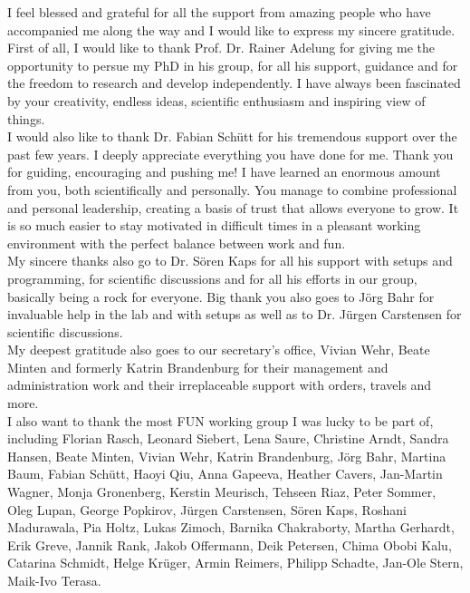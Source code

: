 I feel blessed and grateful for all the support from amazing people who have accompanied me along the way and I would like to express my sincere gratitude.\\

First of all, I would like to thank Prof. Dr. Rainer Adelung for giving me the opportunity to persue my PhD in his group, for all his support, guidance and for the freedom to research and develop independently. I have always been fascinated by your creativity, endless ideas, scientific enthusiasm and inspiring view of things.\\ 

I would also like to thank Dr. Fabian Schütt for his tremendous support over the past few years. I deeply appreciate everything you have done for me. Thank you for guiding, encouraging and pushing me! I have learned an enormous amount from you, both scientifically and personally. You manage to combine professional and personal leadership, creating a basis of trust that allows everyone to grow. It is so much easier to stay motivated in difficult times in a pleasant working environment with the perfect balance between work and fun.\\

My sincere thanks also go to Dr. Sören Kaps for all his support with setups and programming, for scientific discussions and for all his efforts in our group, basically being a rock for everyone. Big thank you also goes to Jörg Bahr for invaluable help in the lab and with setups as well as to Dr. Jürgen Carstensen for scientific discussions.\\

My deepest gratitude also goes to our secretary's office, Vivian Wehr, Beate Minten and formerly Katrin Brandenburg for their management and administration work and their irreplaceable support with orders, travels and more.\\

I also want to thank the most FUN working group I was lucky to be part of, including Florian Rasch, Leonard Siebert, Lena Saure, Christine Arndt, Sandra Hansen, Beate Minten, Vivian Wehr, Katrin Brandenburg, Jörg Bahr, Martina Baum, Fabian Schütt, Haoyi Qiu, Anna Gapeeva, Heather Cavers, Jan-Martin Wagner, Monja Gronenberg, Kerstin Meurisch, Tehseen Riaz, Peter Sommer, Oleg Lupan, George Popkirov, Jürgen Carstensen, Sören Kaps, Roshani Madurawala, Pia Holtz, Lukas Zimoch, Barnika Chakraborty, Martha Gerhardt, Erik Greve, Jannik Rank, Jakob Offermann, Deik Petersen, Chima Obobi Kalu, Catarina Schmidt, Helge Krüger, Armin Reimers, Philipp Schadte, Jan-Ole Stern, Maik-Ivo Terasa.\\  

